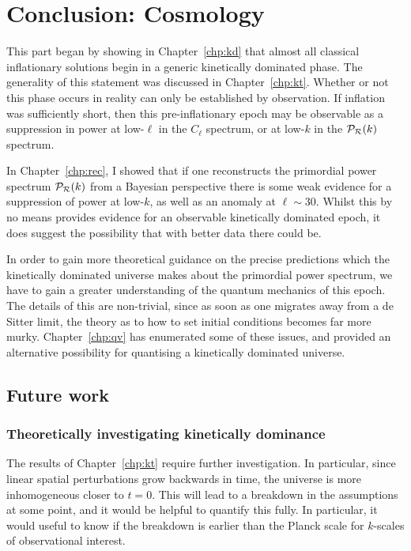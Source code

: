 \chapter*[Conclusion: Cosmology]{Conclusion: Cosmology}

This part began by showing in Chapter~\ref{chp:kd} that almost all classical inflationary solutions begin in a generic kinetically dominated phase. The generality of this statement was discussed in Chapter~\ref{chp:kt}. 
Whether or not this phase occurs in reality can only be established by observation. If inflation was sufficiently short, then this pre-inflationary epoch may be observable as a suppression in power at low-\(\ell\) in the \(C_\ell\) spectrum, or at low-\(k\) in the \(\mathcal{P}_{\mathcal{R}}(k)\) spectrum. 

In Chapter~\ref{chp:rec}, I showed that if one reconstructs the primordial power spectrum \(\mathcal{P}_{\mathcal{R}}(k)\) from a Bayesian perspective there is some weak evidence for a suppression of power at low-\(k\), as well as an anomaly at \(\ell\sim30\). Whilst this by no means provides evidence for an observable kinetically dominated epoch, it does suggest the possibility that with better data there could be.

In order to gain more theoretical guidance on the precise predictions which the kinetically dominated universe makes about the primordial power spectrum, we have to gain a greater understanding of the quantum mechanics of this epoch. The details of this are non-trivial, since as soon as one migrates away from a de Sitter limit, the theory as to how to set initial conditions becomes far more murky. Chapter~\ref{chp:qv} has enumerated some of these issues, and provided an alternative possibility for quantising a kinetically dominated universe.

\section*{Future work}
\subsection*{Theoretically investigating kinetically dominance}
The results of Chapter~\ref{chp:kt} require further investigation. In particular, since linear spatial perturbations grow backwards in time, the universe is more inhomogeneous closer to \(t=0\). This will lead to a breakdown in the assumptions at some point, and it would be helpful to quantify this fully. In particular, it would useful to know if the breakdown is earlier than the Planck scale for \(k\)-scales of observational interest.

